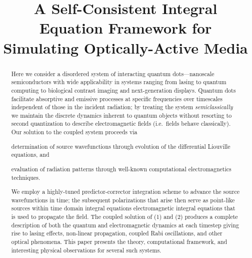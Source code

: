 \documentclass[conference]{IEEEtran}
\begin{document}
\title{A Self-Consistent Integral Equation Framework for Simulating Optically-Active Media}



\maketitle

\begin{abstract}
Here we consider a disordered system of interacting quantum dots---nanoscale semiconductors with wide applicability in systems ranging from lasing to quantum computing to biological contrast imaging and next-generation displays.
Quantum dots facilitate absorptive and emissive processes at specific frequencies over timescales independent of those in the incident radiation; by treating the system \emph{semiclassically} we maintain the discrete dynamics inherent to quantum objects without resorting to second quantization to describe electromagnetic fields (i.e.\ fields behave classically).
Our solution to the coupled system proceeds via
  \begin{inparaenum}[(1)]
  \item determination of source wavefunctions through evolution of the differential Liouville equations, and \label{enum:step 1}
  \item evaluation of radiation patterns through well-known computational electromagnetics techniques. \label{enum:step 2}
  \end{inparaenum}
We employ a highly-tuned predictor-corrector integration scheme to advance the source wavefunctions in time; the subsequent polarizations that arise then serve as point-like sources within time domain integral equations electromagnetic integral equations that is used to propagate the field.
The coupled solution of (1) and (2) produces a complete description of both the quantum and electromagnetic dynamics at each timestep giving rise to lasing effects, non-linear propagation, coupled Rabi oscillations, and other optical phenomena.
This paper presents the theory, computational framework, and interesting physical observations for several such systems.
\end{abstract}
\end{document}
